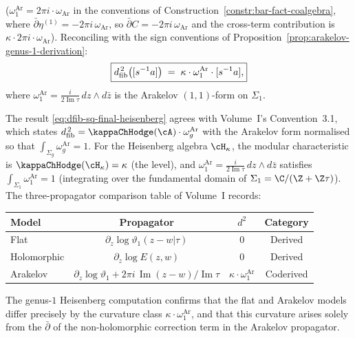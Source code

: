 \begin{computation}
($\omega_1^{\mathrm{Ar}} = 2\pi i \cdot \omega_{\mathrm{Ar}}$ in the conventions
of Construction~\ref{constr:bar-fact-coalgebra}, where
$\bar\partial \eta^{(1)} = -2\pi i\, \omega_{\mathrm{Ar}}$, so
$\bar\partial C = -2\pi i\, \omega_{\mathrm{Ar}}$ and the
cross-term contribution is
$\kappa \cdot 2\pi i \cdot \omega_{\mathrm{Ar}}$).
Reconciling with the sign conventions of
Proposition~\ref{prop:arakelov-genus-1-derivation}:
\begin{equation}\label{eq:dfib-sq-final-heisenberg}
 \boxed{
 d_{\mathrm{fib}}^{\,2}\bigl([s^{-1}a]\bigr)
 \;=\;
 \kappa \cdot \omega_1^{\mathrm{Ar}} \cdot [s^{-1}a],
 }
\end{equation}
where $\omega_1^{\mathrm{Ar}} = \frac{i}{2\operatorname{Im}\tau}\,
dz \wedge d\bar z$ is the Arakelov $(1,1)$-form on $\Sigma_1$.
\end{computation}

\begin{remark}
\label{rem:consistency-vol-I-convention}
The result \eqref{eq:dfib-sq-final-heisenberg} agrees with
Volume~I's Convention~3.1, which states
$\dfib^{\,2} = \kappaChHodge(\cA) \cdot \omega_g^{\mathrm{Ar}}$ with the Arakelov form
normalised so that $\int_{\Sigma_g}\omega_g^{\mathrm{Ar}} = 1$. For the
Heisenberg algebra $\cH_\kappa$, the modular characteristic is
$\kappaChHodge(\cH_\kappa) = \kappa$ (the level), and
$\omega_1^{\mathrm{Ar}} = \frac{i}{2\operatorname{Im}\tau}\,dz \wedge d\bar z$
satisfies $\int_{\Sigma_1}\omega_1^{\mathrm{Ar}} = 1$ (integrating over the
fundamental domain of $\Sigma_1 = \C/(\Z + \Z\tau)$).
The three-propagator comparison table of Volume~I records:
\begin{center}
\renewcommand{\arraystretch}{1.3}
\begin{tabular}{lccc}
\textbf{Model} & \textbf{Propagator} & $d^2$ &
 \textbf{Category} \\
\hline
Flat & $\partial_z\log\vartheta_1(z-w|\tau)$ & $0$ &
 Derived \\
Holomorphic & $\partial_z\log E(z,w)$ & $0$ &
 Derived \\
Arakelov &
 $\partial_z\log\vartheta_1 + 2\pi i\,\operatorname{Im}(z-w)/\operatorname{Im}\tau$
 & $\kappa \cdot \omega_1^{\mathrm{Ar}}$ &
 Coderived
\end{tabular}
\end{center}
The genus-$1$ Heisenberg computation confirms that the flat and
Arakelov models differ precisely by the curvature class
$\kappa \cdot \omega_1^{\mathrm{Ar}}$, and that this curvature arises solely
from the $\bar\partial$ of the non-holomorphic correction term in the
Arakelov propagator.
\end{remark}

